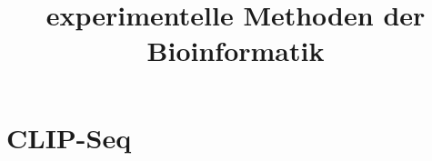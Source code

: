 \documentclass[12pt,a4paper]{article}
\title{\Huge\textbf{experimentelle Methoden der Bioinformatik}}
\author{}
\date{}
\begin{document}
\begin{titlepage}

\maketitle
\thispagestyle{empty}
\end{titlepage}
\newpage

\begin{titlepage}
\tableofcontents
\thispagestyle{empty}
\end{titlepage}
\newpage



\newpage



\newpage

\section{CLIP-Seq}
\end{document}
